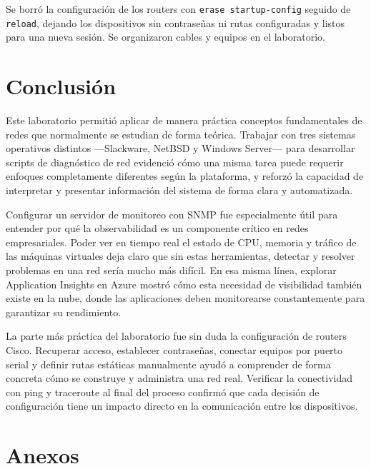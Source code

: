 \documentclass[conference]{IEEEtran}
\begin{document}
Se borró la configuración de los routers con \texttt{erase startup-config} seguido de
\texttt{reload}, dejando los dispositivos sin contraseñas ni rutas configuradas y listos
para una nueva sesión. Se organizaron cables y equipos en el laboratorio.

\section{Conclusión}

Este laboratorio permitió aplicar de manera práctica conceptos fundamentales de redes que
normalmente se estudian de forma teórica. Trabajar con tres sistemas operativos distintos
---Slackware, NetBSD y Windows Server--- para desarrollar scripts de diagnóstico de red
evidenció cómo una misma tarea puede requerir enfoques completamente diferentes según la
plataforma, y reforzó la capacidad de interpretar y presentar información del sistema de
forma clara y automatizada.

Configurar un servidor de monitoreo con SNMP fue especialmente útil para entender por qué
la observabilidad es un componente crítico en redes empresariales. Poder ver en tiempo real
el estado de CPU, memoria y tráfico de las máquinas virtuales deja claro que sin estas
herramientas, detectar y resolver problemas en una red sería mucho más difícil. En esa misma
línea, explorar Application Insights en Azure mostró cómo esta necesidad de visibilidad también
existe en la nube, donde las aplicaciones deben monitorearse constantemente para garantizar
su rendimiento.

La parte más práctica del laboratorio fue sin duda la configuración de routers Cisco.
Recuperar acceso, establecer contraseñas, conectar equipos por puerto serial y definir rutas
estáticas manualmente ayudó a comprender de forma concreta cómo se construye y administra
una red real. Verificar la conectividad con ping y traceroute al final del proceso confirmó
que cada decisión de configuración tiene un impacto directo en la comunicación entre los
dispositivos.

\section*{Anexos}
\end{document}
